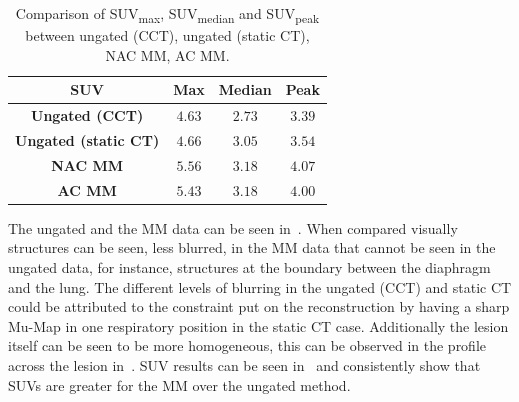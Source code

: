             \begin{table}
                \centering
                
                \captionsetup{singlelinecheck=false}
                \caption{
                    Comparison of \gls{SUV}\textsubscript{max}, \gls{SUV}\textsubscript{median} and \gls{SUV}\textsubscript{peak} between ungated (\gls{CCT}), ungated (static \gls{CT}), \gls{NAC} \gls{MM}, \gls{AC} \gls{MM}.
                }
                
                \resizebox*{1.0\linewidth}{!}
                {
                    \begin{tabular}{||c|ccc||}
                        \hline
                        \textbf{\gls{SUV}}                  & \textbf{Max}  & \textbf{Median}   & \textbf{Peak} \\
                        \hline
                        \textbf{Ungated (\gls{CCT})}        & $4.63$        & $2.73$                     & $3.39$ \\
                        \textbf{Ungated (static \gls{CT})}  & $4.66$        & $3.05$                     & $3.54$ \\
                        \hline
                        \textbf{\gls{NAC} \gls{MM}}         & $5.56$        & $3.18$                     & $4.07$ \\
                        \textbf{\gls{AC} \gls{MM}}          & $5.43$        & $3.18$                     & $4.00$ \\
                        \hline
                    \end{tabular}
                }
                \label{tab:pet_ct_respiratory_motion_correction_with_a_single_attenuation_map_using_nac_derived_deformation_fields_results_suv}
            \end{table}
            
             The ungated and the \gls{MM} data can be seen in~. When compared visually structures can be seen, less blurred, in the \gls{MM} data that cannot be seen in the ungated data, for instance, structures at the boundary between the diaphragm and the lung. The different levels of blurring in the ungated (\gls{CCT}) and static \gls{CT} could be attributed to the constraint put on the reconstruction by having a sharp \gls{Mu-Map} in one respiratory position in the static \gls{CT} case. Additionally the lesion itself can be seen to be more homogeneous, this can be observed in the profile across the lesion in~. \gls{SUV} results can be seen in~ and consistently show that \glspl{SUV} are greater for the \gls{MM} over the ungated method.
            
